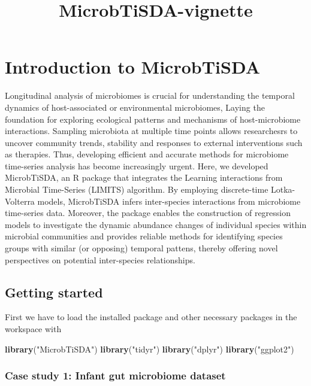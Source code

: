 \documentclass[
]{article}
\title{MicrobTiSDA-vignette}
\author{}
\date{\vspace{-2.5em}}
\newenvironment{Shaded}{\begin{snugshade}}{\end{snugshade}}
\newcommand{\FunctionTok}[1]{\textcolor[rgb]{0.13,0.29,0.53}{\textbf{#1}}}
\newcommand{\NormalTok}[1]{#1}
\newcommand{\StringTok}[1]{\textcolor[rgb]{0.31,0.60,0.02}{#1}}
\begin{document}
\maketitle

\section{Introduction to MicrobTiSDA}\label{introduction-to-microbtisda}

Longitudinal analysis of microbiomes is crucial for understanding the
temporal dynamics of host-associated or environmental microbiomes,
Laying the foundation for exploring ecological patterns and mechanisms
of host-microbiome interactions. Sampling microbiota at multiple time
points allows researchesrs to uncover community trends, stability and
responses to external interventions such as therapies. Thus, developing
efficient and accurate methods for microbiome time-series analysis has
become increasingly urgent. Here, we developed MicrobTiSDA, an R package
that integrates the Learning interactions from Microbial Time-Series
(LIMITS) algorithm. By employing discrete-time Lotka-Volterra models,
MicrobTiSDA infers inter-species interactions from microbiome
time-series data. Moreover, the package enables the construction of
regression models to investigate the dynamic abundance changes of
individual species within microbial communities and provides reliable
methods for identifying species groups with similar (or opposing)
temporal pattens, thereby offering novel perspectives on potential
inter-species relationships.

\subsection{Getting started}\label{getting-started}

First we have to load the installed package and other necessary packages
in the workspace with

\begin{Shaded}
\begin{Highlighting}[]
\FunctionTok{library}\NormalTok{(}\StringTok{"MicrobTiSDA"}\NormalTok{)}
\FunctionTok{library}\NormalTok{(}\StringTok{"tidyr"}\NormalTok{)}
\FunctionTok{library}\NormalTok{(}\StringTok{"dplyr"}\NormalTok{)}
\FunctionTok{library}\NormalTok{(}\StringTok{"ggplot2"}\NormalTok{)}
\end{Highlighting}
\end{Shaded}

\subsubsection{Case study 1: Infant gut microbiome
dataset}\label{case-study-1-infant-gut-microbiome-dataset}
\end{document}
